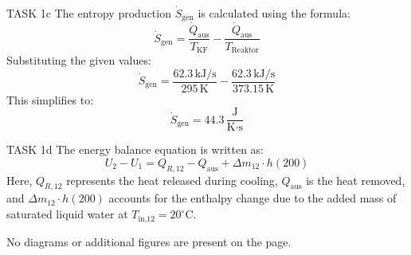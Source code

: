 TASK 1c  
The entropy production \( \dot{S}_{\text{gen}} \) is calculated using the formula:  
\[
\dot{S}_{\text{gen}} = \frac{\dot{Q}_{\text{aus}}}{T_{\text{KF}}} - \frac{\dot{Q}_{\text{aus}}}{T_{\text{Reaktor}}}
\]  
Substituting the given values:  
\[
\dot{S}_{\text{gen}} = \frac{62.3 \, \text{kJ/s}}{295 \, \text{K}} - \frac{62.3 \, \text{kJ/s}}{373.15 \, \text{K}}
\]  
This simplifies to:  
\[
\dot{S}_{\text{gen}} = 44.3 \, \frac{\text{J}}{\text{K·s}}
\]  

TASK 1d  
The energy balance equation is written as:  
\[
U_2 - U_1 = Q_{R,12} - Q_{\text{aus}} + \Delta m_{12} \cdot h(200)
\]  
Here, \( Q_{R,12} \) represents the heat released during cooling, \( Q_{\text{aus}} \) is the heat removed, and \( \Delta m_{12} \cdot h(200) \) accounts for the enthalpy change due to the added mass of saturated liquid water at \( T_{\text{in,12}} = 20^\circ\text{C} \).  

No diagrams or additional figures are present on the page.